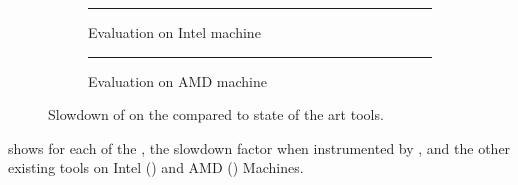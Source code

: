 \begin{figure}[htb]
    \centering
    \begin{subfigure}{\linewidth}
        \rule{8cm}{7cm}
        \caption{Evaluation on Intel machine}
        \label{fig:ovh-Intel}
    \end{subfigure}

    \begin{subfigure}{\linewidth}
        \rule{8cm}{7cm}
        \caption{Evaluation on AMD machine}
        \label{fig:ovh-AMD}
    \end{subfigure}
    \caption{Slowdown of \Moca on the \NPB compared to state of the art tools.}
    \label{fig:ovh}
\end{figure}

 shows for each of the \NPB, the slowdown factor when
instrumented by \Moca, \MocaPin and the other existing tools on Intel
() and AMD () Machines.

